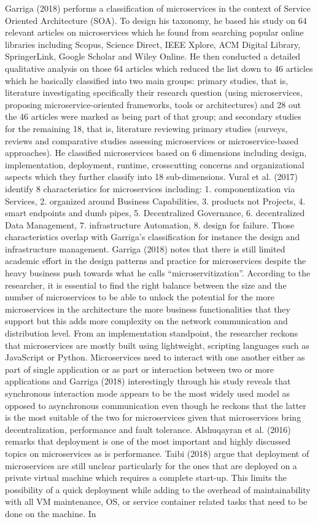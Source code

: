 \documentclass{article}
\begin{document}
Garriga (2018) performs a classification of microservices in the context of Service Oriented Architecture (SOA). To design his taxonomy, he based his study on 64 relevant articles on microservices which he found from searching popular online libraries including Scopus, Science Direct, IEEE Xplore, ACM Digital Library, SpringerLink, Google Scholar and Wiley Online. He then conducted a detailed qualitative analysis on those 64 articles which reduced the list down to 46 articles which he basically classified into two main groups: primary studies, that is, literature investigating specifically their research question (using microservices, proposing microservice-oriented frameworks, tools or architectures) and 28 out the 46 articles were marked as being part of that group; and secondary studies for the remaining 18, that is, literature reviewing primary studies (surveys, reviews and comparative studies assessing microservices or microservice-based approaches). He classified microservices based on 6 dimensions including design, implementation, deployment, runtime, crosscutting concerns and organizational aspects which they further classify into 18 sub-dimensions. Vural et al. (2017) identify 8 characteristics for microservices including: 1. componentization via Services, 2. organized around Business Capabilities, 3. products not Projects, 4. smart endpoints and dumb pipes, 5. Decentralized Governance, 6. decentralized Data Management, 7. infrastructure Automation, 8. design for failure. Those characteristics overlap with Garriga’s classification for instance the design and infrastructure management. Garriga (2018) notes that there is still limited academic effort in the design patterns and practice for microservices despite the heavy business push towards what he calls “microservitization”. According to the researcher, it is essential to find the right balance between the size and the number of microservices to be able to unlock the potential for the more microservices in the architecture the more business functionalities that they support but this adds more complexity on the network communication and distribution level. From an implementation standpoint, the researcher reckons that microservices are mostly built using lightweight, scripting languages such as JavaScript or Python. Microservices need to interact with one another either as part of single application or as part or interaction between two or more applications and Garriga (2018) interestingly through his study reveals that synchronous interaction mode appears to be the most widely used model as opposed to asynchronous communication even though he reckons that the latter is the most suitable of the two for microservices given that microservices bring decentralization, performance and fault tolerance. Alshuqayran et al. (2016) remarks that deployment is one of the most important and highly discussed topics on microservices as is performance. Taibi (2018) argue that deployment of microservices are still unclear particularly for the ones that are deployed on a private virtual machine which requires a complete start-up. This limits the possibility of a quick deployment while adding to the overhead of maintainability with all VM maintenance, OS, or service container related tasks that need to be done on the machine.  In 
\end{document}

